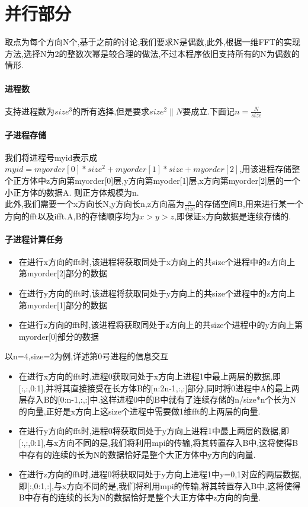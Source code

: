 \documentclass[UTF8]{ctexart}
\begin{document}
\section{并行部分}
取点为每个方向N个,基于之前的讨论,我们要求N是偶数,此外,根据一维FFT的实现方法,选择N为2的整数次幂是较合理的做法,不过本程序依旧支持所有的N为偶数的情形.
\paragraph{进程数}
支持进程数为$size^3$的所有选择,但是要求$size^2\|N$要成立.下面记$n=\frac{N}{size}$
\paragraph{子进程存储}
我们将进程号myid表示成$myid=myorder[0]*size^2+myorder[1]*size+myorder[2]$,用该进程存储整个正方体中z方向第myorder[0]层,y方向第myoder[1]层,x方向第myorder[2]层的一个小正方体的数据A. 则正方体规模为n.\\
此外,我们需要一个x方向长N,y方向长n,z方向高为$\frac{n}{size}$的存储空间B,用来进行某一个方向的fft以及ifft.A,B的存储顺序均为$x>y>z$,即保证x方向数据是连续存储的.
\paragraph{子进程计算任务}
\begin{itemize}
\item 在进行x方向的fft时,该进程将获取同处于x方向上的共size个进程中的z方向上第myorder[2]部分的数据
\item 在进行y方向的fft时,该进程将获取同处于y方向上的共size个进程中的z方向上第myorder[1]部分的数据
\item 在进行z方向的fft时,该进程将获取同处于z方向上的共size个进程中的y方向上第myorder[0]部分的数据
\end{itemize}
以n=4,size=2为例,详述第0号进程的信息交互
\begin{itemize}
\item 在进行x方向的fft时,进程0获取同处于x方向上进程1中最上两层的数据,即[:,:,0:1],并将其直接接受在长方体B的[n:2n-1,:,:]部分,同时将0进程中A的最上两层存入B的[0:n-1,:,:]中.这样进程0中的B中就有了连续存储的n/size*n个长为N的向量,正好是x方向上这size个进程中需要做1维fft的上两层的向量.
\item 在进行y方向的fft时,进程0将获取同处于y方向上进程1中最上两层的数据,即[:,:,0:1],与x方向不同的是,我们将利用mpi的传输,将其转置存入B中,这将使得B中存有的连续的长为N的数据恰好是整个大正方体中y方向的向量.
\item  在进行z方向的fft时,进程0将获取同处于y方向上进程1中y=0,1对应的两层数据,即[:,0:1,:],与x方向不同的是,我们将利用mpi的传输,将其转置存入B中,这将使得B中存有的连续的长为N的数据恰好是整个大正方体中z方向的向量.
\end{itemize}
\end{document}
